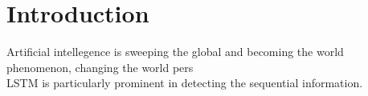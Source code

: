 \section{Introduction}
Artificial intellegence is sweeping the global and becoming the world phenomenon, changing the world pers
\\
LSTM is particularly prominent in detecting the sequential information. 